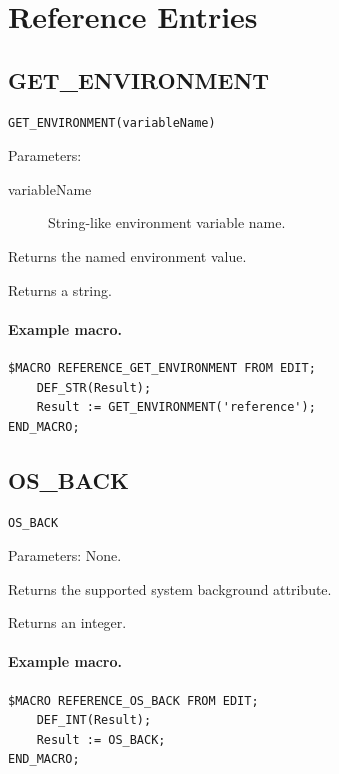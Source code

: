 \documentclass[a4paper,10pt,twoside,openany]{book}
\begin{document}
\section{Reference Entries}

\label{prim:intrinsic-get-environment}
\subsection*{GET\_ENVIRONMENT}
\begin{verbatim}
GET_ENVIRONMENT(variableName)
\end{verbatim}
Parameters:
\begin{description}
\item[variableName] String-like environment variable name.
\end{description}

Returns the named environment value.

Returns a string.

\paragraph{Example macro.}
\begin{verbatim}
$MACRO REFERENCE_GET_ENVIRONMENT FROM EDIT;
    DEF_STR(Result);
    Result := GET_ENVIRONMENT('reference');
END_MACRO;
\end{verbatim}

\label{prim:intrinsic-os-back}
\subsection*{OS\_BACK}
\begin{verbatim}
OS_BACK
\end{verbatim}
Parameters: None.

Returns the supported system background attribute.

Returns an integer.

\paragraph{Example macro.}
\begin{verbatim}
$MACRO REFERENCE_OS_BACK FROM EDIT;
    DEF_INT(Result);
    Result := OS_BACK;
END_MACRO;
\end{verbatim}

\label{prim:intrinsic-os-color}
\end{document}
